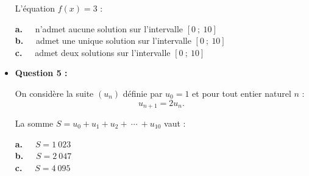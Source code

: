 \begin{itemize}
\begin{center}
\begin{extern}
          \end{extern}
     \end{center}
     L'équation $f(x)=3$ :
     \par
     \textbf{a.~~} n'admet aucune solution sur l'intervalle $[0~;~10]$ \\
     \textbf{b.~~} admet une unique solution sur l'intervalle $[0~;~10]$  \\
     \textbf{c.~~} admet deux solutions sur l'intervalle $[0~;~10]$ \\
     \par
     \item \textbf{Question 5 :}
     \par
     On considère la suite $(u_n)$ définie par $u_0=1$ et pour tout entier naturel $n$ :
     \[u_{n+1}=2u_n.\]
     \par
     La somme $S=u_0+u_1+u_2+\ \cdots\ +u_{10}$ vaut :
     \par
     \textbf{a.~~} $S=1\ 023$ \\
     \textbf{b.~~} $S=2\ 047$  \\
     \textbf{c.~~} $S=4\ 095$ \\
     \par
\end{itemize}
